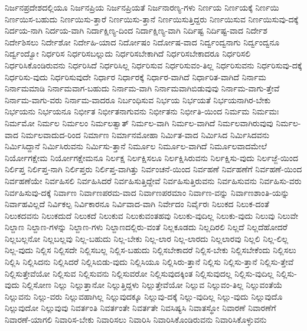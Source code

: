 {ನಿರ್ಜನಪ್ರದೇಶದಲ್ಲಿಯೂ
ನಿರ್ಜನಪ್ರಿಯ
ನಿರ್ಜನಪ್ರಿಯತೆ
ನಿರ್ಜನಾರಣ್ಯ-ಗಳು
ನಿರ್ಣಯ
ನಿರ್ಣಯಕ್ಕೆ
ನಿರ್ಣಯಿ
ನಿರ್ಣಯಿಸ-ಬಹುದು
ನಿರ್ಣಯಿಸು-ತ್ತಾರೆ
ನಿರ್ಣಯಿಸು-ತ್ತಾನೆ
ನಿರ್ಣಯಿಸುತ್ತಿದ್ದರು
ನಿರ್ಣಯಿಸುವ
ನಿರ್ಣಯಿಸುವು-ದಕ್ಕೆ
ನಿರ್ದಯ-ನಾಗಿ
ನಿರ್ದಯ-ವಾಗಿ
ನಿರ್ದಾಕ್ಷಿಣ್ಯ-ದಿಂದ
ನಿರ್ದಾಕ್ಷಿಣ್ಯ-ವಾಗಿ
ನಿರ್ದಿಷ್ಟ
ನಿರ್ದಿಷ್ಟ-ವಾದ
ನಿರ್ದೇಶ
ನಿರ್ದೇಶಿಸಲು
ನಿರ್ದೇಶೋ
ನಿರ್ದೇಹಿ-ಯಾದ
ನಿರ್ದೋಷಂ
ನಿರ್ದೋಷ-ವಾದ
ನಿರ್ದ್ವಂದ್ವನಾಗು
ನಿರ್ದ್ವಂದ್ವನೂ
ನಿರ್ದ್ವಂದ್ವೋ
ನಿರ್ಧರಿಸ
ನಿರ್ಧರಿಸಬಲ್ಲುದು
ನಿರ್ಧರಿಸಬೇಕಾಗಿದೆ
ನಿರ್ಧರಿಸಬೇಕಾದರೂ
ನಿರ್ಧರಿಸಲಿ
ನಿರ್ಧರಿಸಿಕೊಂಡಿರುವನು
ನಿರ್ಧರಿಸಿದೆ
ನಿರ್ಧರಿಸಿಲ್ಲ
ನಿರ್ಧರಿಸುವ
ನಿರ್ಧರಿಸುವಂ-ತಿಲ್ಲ
ನಿರ್ಧರಿಸುವನು
ನಿರ್ಧರಿಸುವು-ದಕ್ಕೆ
ನಿರ್ಧರಿಸು-ವುದು
ನಿರ್ಧರಿಸುವುದೇ
ನಿರ್ಧಾರ
ನಿರ್ಧಾರಕ್ಕೆ
ನಿರ್ಧಾರ-ವಾಗಿದೆ
ನಿರ್ಧಾರಿತ-ವಾಗಿದೆ
ನಿರ್ನಾಮ
ನಿರ್ನಾಮಮಾಡಿ
ನಿರ್ನಾಮವಾಗ-ಬಹುದು
ನಿರ್ನಾಮ-ವಾಗಿ
ನಿರ್ನಾಮವಾಗಿಬಿಡುವುವು
ನಿರ್ನಾಮ-ವಾಗು-ತ್ತೇವೆ
ನಿರ್ನಾಮ-ವಾಗು-ವರು
ನಿರ್ನಾಮ-ವಾದರೂ
ನಿರ್ಬಂಧಿಸುವ
ನಿರ್ಭಯ
ನಿರ್ಭಯತೆ
ನಿರ್ಭಯನಾಗಿರ-ಬೇಕು
ನಿರ್ಭಯನು
ನಿರ್ಭಯನೂ
ನಿರ್ಭೀತ
ನಿರ್ಭೀತನಾಗುವನು
ನಿರ್ಭೀತನು
ನಿರ್ಭೀತಿ-ಯಿಂದ
ನಿರ್ಮಮ
ನಿರ್ಮಮಃ
ನಿರ್ಮಮೋ
ನಿರ್ಮಲ
ನಿರ್ಮಲಂ
ನಿರ್ಮಲತ್ವಾತ್
ನಿರ್ಮಲ-ವಾಗಿ
ನಿರ್ಮಲ-ವಾಗಿದೆ
ನಿರ್ಮಲವಾಗಿರುವುವು
ನಿರ್ಮಲ-ವಾದ
ನಿರ್ಮಲವಾದುದ-ರಿಂದ
ನಿರ್ಮಾಣ
ನಿರ್ಮಾನಮೋಹಾ
ನಿರ್ಮಿತ-ವಾದ
ನಿರ್ಮಿಸಿದ
ನಿರ್ಮಿಸಿದವನು
ನಿರ್ಮಿಸಿದ್ದಾನೆ
ನಿರ್ಮಿಸಿರುವನು
ನಿರ್ಮಿಸು-ತ್ತಾನೆ
ನಿರ್ಮೂಲ
ನಿರ್ಮೂಲ-ವಾಗಿದೆ
ನಿರ್ಮೂಲವಾದಮೇಲೆ
ನಿರ್ಯೋಗಕ್ಷೇಮ
ನಿರ್ಯೋಗಕ್ಷೇಮನೂ
ನಿರ್ಲಕ್ಷ
ನಿರ್ಲಕ್ಷಿಸಲೂ
ನಿರ್ಲಕ್ಷಿಸಿರುವನು
ನಿರ್ಲಕ್ಷಿಸು-ವುದು
ನಿರ್ಲಜ್ಜೆ-ಯಿಂದ
ನಿರ್ಲಿಪ್ತ
ನಿರ್ಲಿಪ್ತ-ನಾಗಿ
ನಿರ್ಲಿಪ್ತರು
ನಿರ್ಲಿಪ್ತ-ವಾಗಿತ್ತು
ನಿರ್ವಂಚನೆ-ಯಿಂದ
ನಿರ್ವಹಣೆ
ನಿರ್ವಹಣೆಗೆ
ನಿರ್ವಹಣೆ-ಯಿಂದ
ನಿರ್ವಹಣೆಯೇ
ನಿರ್ವಹಿಸಲಿ
ನಿರ್ವಹಿಸಿದರೆ
ನಿರ್ವಹಿಸುತ್ತಿದ್ದೇವೆ
ನಿರ್ವಹಿಸುತ್ತಿರುವನು
ನಿರ್ವಹಿಸುವನು
ನಿರ್ವಹಿಸು-ವರು
ನಿರ್ವಹಿಸುವು-ದಕ್ಕೆ
ನಿರ್ವಾಣ
ನಿರ್ವಾಣಪರಮ-ವಾದ
ನಿರ್ವಾಣಪರಮಾಂ
ನಿರ್ವಾಣ-ವನ್ನು
ನಿರ್ವಾಣಶಾಂತಿ-ಯನ್ನು
ನಿರ್ವಾಹವಿಲ್ಲದೆ
ನಿರ್ವಿಕಲ್ಪ
ನಿರ್ವಿಕಾರನೂ
ನಿರ್ವಿವಾದ-ವಾಗಿ
ನಿರ್ವೇದಂ
ನಿರ್ವೈರಃ
ನಿಲುಕದ
ನಿಲುಕ-ದಂತೆ
ನಿಲುಕದವನು
ನಿಲುಕದುದೆ
ನಿಲುಕದೆ
ನಿಲುಕುವ
ನಿಲುಕುವಂತಹವು
ನಿಲುಕು-ವುದಿಲ್ಲ
ನಿಲುಕು-ವುದು
ನಿಲುವು
ನಿಲುವೇ
ನಿಲ್ದಾಣ
ನಿಲ್ದಾಣ-ಗಳನ್ನು
ನಿಲ್ದಾಣ-ಗಳು
ನಿಲ್ದಾಣದಲ್ಲಿರು-ವಂತೆ
ನಿಲ್ಲಕೂಡದು
ನಿಲ್ಲದಿರಲಿ
ನಿಲ್ಲದೆ
ನಿಲ್ಲದೆಹೋದರೆ
ನಿಲ್ಲಬಲ್ಲನೋ
ನಿಲ್ಲಬಲ್ಲವು
ನಿಲ್ಲ-ಬಹುದು
ನಿಲ್ಲ-ಬೇಕು
ನಿಲ್ಲ-ಲಾರ
ನಿಲ್ಲ-ಲಾರದು
ನಿಲ್ಲಲಾರವು
ನಿಲ್ಲಲಿ
ನಿಲ್ಲ-ಲಿಲ್ಲ
ನಿಲ್ಲ-ವುದು
ನಿಲ್ಲಿಸ
ನಿಲ್ಲಿಸದೇ
ನಿಲ್ಲಿಸಬಲ್ಲ
ನಿಲ್ಲಿಸ-ಬಹುದು
ನಿಲ್ಲಿಸಬೇಕಾದರೆ
ನಿಲ್ಲಿಸ-ಬೇಕು
ನಿಲ್ಲಿಸಬೇಕೆಂದು
ನಿಲ್ಲಿಸಲು
ನಿಲ್ಲಿಸಿ
ನಿಲ್ಲಿಸಿದನು
ನಿಲ್ಲಿಸಿದರೆ
ನಿಲ್ಲಿಸಿಬಿಡು-ವುದು
ನಿಲ್ಲಿಸಿಯೂ
ನಿಲ್ಲಿಸಿರು-ತ್ತಾನೆ
ನಿಲ್ಲಿಸು
ನಿಲ್ಲಿಸು-ತ್ತಾನೆ
ನಿಲ್ಲಿಸು-ತ್ತೇವೆ
ನಿಲ್ಲಿಸುತ್ತೇವೆಯೋ
ನಿಲ್ಲಿಸುವ
ನಿಲ್ಲಿಸುವನು
ನಿಲ್ಲಿಸುವರೋ
ನಿಲ್ಲಿಸುವುದಕ್ಕಿಂತ
ನಿಲ್ಲಿಸುವುದಲ್ಲ
ನಿಲ್ಲಿಸು-ವುದಿಲ್ಲ
ನಿಲ್ಲಿಸು-ವುದು
ನಿಲ್ಲಿಸೋಣ
ನಿಲ್ಲು
ನಿಲ್ಲುತ್ತಾನೋ
ನಿಲ್ಲುತ್ತಿದ್ದಳು
ನಿಲ್ಲುತ್ತೇವೆಯೋ
ನಿಲ್ಲುವ
ನಿಲ್ಲುವಂ-ತಿಲ್ಲ
ನಿಲ್ಲುವಂತೆಯೆ
ನಿಲ್ಲುವನು
ನಿಲ್ಲು-ವರು
ನಿಲ್ಲುವಹಾಗಿಲ್ಲ
ನಿಲ್ಲುವುದಕ್ಕೂ
ನಿಲ್ಲುವು-ದಕ್ಕೆ
ನಿಲ್ಲು-ವುದಿಲ್ಲ
ನಿಲ್ಲು-ವುದು
ನಿಲ್ಲುವುದೊ
ನಿಲ್ಲುವುದೋ
ನಿಲ್ಲುವುವು
ನಿವರ್ತಂತಿ
ನಿವರ್ತಂತೇ
ನಿವರ್ತತೇ
ನಿವಸಿಷ್ಯಸಿ
ನಿವಾತಸ್ಥೋ
ನಿವಾರಣೆ
ನಿವಾರಣೆಗೆ
ನಿವಾರಣೆ-ಯಾಗಲಿ
ನಿವಾರಿಸ-ಬೇಕು
ನಿವಾರಿಸಲು
ನಿವಾರಿಸಿ
ನಿವಾರಿಸಿಕೊಂಡಿರುವನು
ನಿವಾರಿಸಿಕೊಳ್ಳುವನು
}

